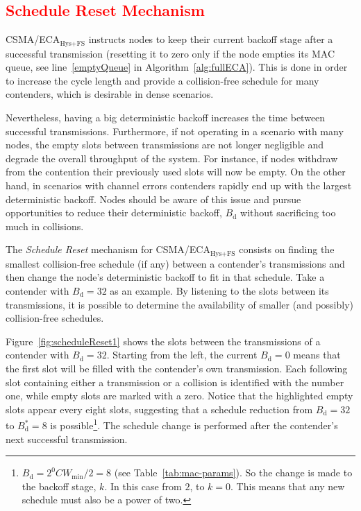 	\textcolor{red}{\subsection{Schedule Reset Mechanism}\label{schedReset}}
	CSMA/ECA$_{\text{Hys+FS}}$ instructs nodes to keep their current backoff stage after a successful transmission (resetting it to zero only if the node empties its MAC queue, see line~\ref{emptyQueue} in Algorithm~\ref{alg:fullECA}). This is done in order to increase the cycle length and provide a collision-free schedule for many contenders, which is desirable in dense scenarios.
	
	Nevertheless, having a big deterministic backoff increases the time between successful transmissions. Furthermore, if not operating in a scenario with many nodes, the empty slots between transmissions are not longer negligible and degrade the overall throughput of the system. For instance, if nodes withdraw from the contention their previously used slots will now be empty. On the other hand, in scenarios with channel errors contenders rapidly end up with the largest deterministic backoff. Nodes should be aware of this issue and pursue opportunities to reduce their deterministic backoff, $B_{\text{d}}$ without sacrificing too much in collisions. 
	
	The \emph{Schedule Reset} mechanism for CSMA/ECA$_{\text{Hys+FS}}$ consists on finding the smallest collision-free schedule (if any) between a contender's transmissions and then change the node's deterministic backoff to fit in that schedule. Take a contender with $B_{\text{d}}=32$ as an example. By listening to the slots between its transmissions, it is possible to determine the availability of smaller (and possibly) collision-free schedules.
	
	Figure~\ref{fig:scheduleReset1} shows the slots between the transmissions of a contender with $B_{\text{d}}=32$. Starting from the left, the current $B_{\text{d}}=0$ means that the first slot will be filled with the contender's own transmission. Each following slot containing either a transmission or a collision is identified with the number one, while empty slots are marked with a zero. Notice that the highlighted empty slots appear every eight slots, suggesting that a schedule reduction from $B_{\text{d}}=32$ to $B_{\text{d}}^{*}=8$ is possible\footnote{$B_{\text{d}}=2^{0}CW_{\min}/2=8$ (see Table~\ref{tab:mac-params}). So the change is made to the backoff stage, $k$. In this case from $2$, to $k=0$. This means that any new schedule must also be a power of two.}. The schedule change is performed after the contender's next successful transmission.
	

